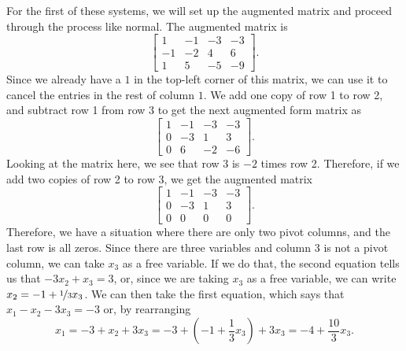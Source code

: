 \documentclass{ximera}
\begin{document}
\begin{exampleSol}
    For the first of these systems, we will set up the augmented matrix and proceed through the process like normal. The augmented matrix is
    \begin{equation*}
        \left[ 
            \begin{array}{ccc|c}
                1 & -1 & -3 & -3 \\
                -1 & -2 & 4 & 6 \\
                1 & 5 & -5 & -9
            \end{array}
        \right].
    \end{equation*}
    Since we already have a $1$ in the top-left corner of this matrix, we can use it to cancel the entries in the rest of column $1$.  We add one copy of row 1 to row 2, and subtract row 1 from row 3 to get the next augmented form matrix as
    \begin{equation*}
        \left[ 
            \begin{array}{ccc|c}
                1 & -1 & -3 & -3 \\
                0 & -3 & 1 & 3 \\
                0 & 6 & -2 & -6
            \end{array}
        \right].
    \end{equation*}
    Looking at the matrix here, we see that row 3 is $-2$ times row 2. Therefore, if we add two copies of row 2 to row 3, we get the augmented matrix
    \begin{equation*}
        \left[ 
            \begin{array}{ccc|c}
                1 & -1 & -3 & -3 \\
                0 & -3 & 1 & 3 \\
                0 & 0 & 0 & 0
            \end{array}
        \right].
    \end{equation*}
    Therefore, we have a situation where there are only two pivot columns, and the last row is all zeros. Since there are three variables and column 3 is not a pivot column, we can take $x_3$ as a free variable. If we do that, the second equation tells us that $-3x_2 + x_3 = 3$, or, since we are taking $x_3$ as a free variable, we can write $x_2 = -1 + \nicefrac{1}{3}x_3$. We can then take the first equation, which says that $x_1 - x_2 - 3x_3 = -3$ or, by rearranging
    \begin{equation*}
        x_1 = -3 + x_2 + 3x_3 = -3 + \left(-1 + \frac{1}{3}x_3\right) + 3x_3 = -4 + \frac{10}{3}x_3.

\end{equation*}
\end{exampleSol}
\end{document}

